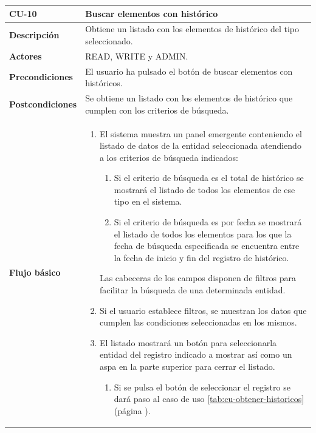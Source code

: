 
\begin{table} [H]
    \centering
    \setlength{\leftmargini}{0.4cm}
	\resizebox{15cm}{!} { %
    \begin{tabular}{| m{3cm} | m{12cm} |}   
    \hline
	  \textbf{CU-10} & \textbf{Buscar elementos con histórico} \\\hline
	  \textbf{Descripción} & Obtiene un listado con los elementos de histórico del tipo seleccionado. \\\hline
	  \textbf{Actores} & READ, WRITE y ADMIN. \\\hline
	  \textbf{Precondiciones} & El usuario ha pulsado el botón de buscar elementos con históricos. \\\hline
	  \textbf{Postcondiciones} & Se obtiene un listado con los elementos de histórico que cumplen con los criterios de búsqueda. \\\hline
	  \textbf{Flujo básico} & 
		\begin{enumerate}
	  	\item El sistema muestra un panel emergente conteniendo el listado de datos de la entidad seleccionada atendiendo a los criterios de búsqueda indicados:
			\begin{enumerate}	
			   \item Si el criterio de búsqueda es el total de histórico se mostrará el listado de todos los elementos de ese tipo en el sistema.
			   \item Si el criterio de búsqueda es por fecha se mostrará el listado de todos los elementos para los que la fecha de búsqueda especificada se encuentra entre la fecha de inicio y fin del registro de histórico.
			\end{enumerate}
		    Las cabeceras de los campos disponen de filtros para facilitar la búsqueda de una determinada entidad.
		\item Si el usuario establece filtros, se muestran los datos que cumplen las condiciones seleccionadas en los mismos.
		\item El listado mostrará un botón para seleccionarla entidad del registro indicado a mostrar así como un aspa en la parte superior para cerrar el listado.
		       \begin{enumerate}	
			        \item Si se pulsa el botón de seleccionar el registro se dará paso al caso de uso \ref{tab:cu-obtener-historicos} (página \pageref{tab:cu-obtener-historicos}).

\end{enumerate}
\end{enumerate}
\end{tabular}}
\end{table}
